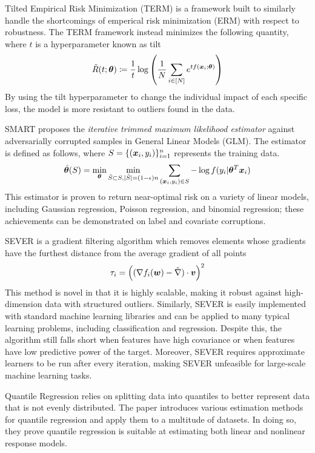 \documentclass{article} %
\begin{document}
	Tilted Empirical Risk Minimization (TERM) \cite{li2020tilted} is a framework built to similarly handle the shortcomings of emperical risk minimization (ERM) with respect to robustness. The TERM framework instead minimizes the following quantity, where $t$ is a hyperparameter known as tilt
	\begin{equation}
		\tilde{R}(t;{\bm{\theta}}) \coloneqq \frac{1}{t} \log\left(\frac{1}{N}\sum_{i \in \left[N\right]}e^{tf({\bm{x}}_i;{\bm{\theta}})} \right)
	\end{equation}
	By using the tilt hyperparameter to change the individual impact of each specific loss, the model is more resistant to outliers found in the data.
	
	SMART \cite{https://doi.org/10.48550/arxiv.2206.04777} proposes the \textit{iterative trimmed maximum likelihood estimator} against adversarially corrupted samples in General Linear Models (GLM). The estimator is defined as follows, where $S = \{({\bm{x}}_i,y_i)\}_{i=1}^n$ represents the training data. \vspace{1em}
	\begin{equation}
		\hat{{\bm{\theta}}}(S) = \min_{{\bm{\theta}}} \min_{\hat{S} \subset S, |\hat{S}| = (1-{\epsilon})n} \sum_{({\bm{x}}_i,y_i) \in S} -\log f(y_i|{\bm{\theta}}^T{\bm{x}}_i)
	\end{equation}
	This estimator is proven to return near-optimal risk on a variety of linear models, including Gaussian regression, Poisson regression, and binomial regression; these achievements can be demonstrated on label and covariate corruptions.
	
	
	SEVER \cite{DiakonikolasKKLSS19} is a gradient filtering algorithm which removes elements whose gradients have the furthest distance from the average gradient of all points
	\begin{equation}
		\tau_i = \left((\nabla f_i({\bm{w}}) - \hat{\nabla})\cdot {\bm{v}}\right)^2
	\end{equation}
	This method is novel in that it is highly scalable, making it robust against high-dimension data with structured outliers. Similarly, SEVER is easily implemented with standard machine learning libraries and can be applied to many typical learning problems, including classification and regression. Despite this, the algorithm still falls short when features have high covariance or when features have low predictive power of the target. Moreover, SEVER requires approximate learners to be run after every iteration, making SEVER unfeasible for large-scale machine learning tasks. 
	
	Quantile Regression \cite{yu_quantile_2003} relies on splitting data into quantiles to better represent data that is not evenly distributed. The paper introduces various estimation methods for quantile regression and apply them to a multitude of datasets. In doing so, they prove quantile regression is suitable at estimating both linear and nonlinear response models.
	
\end{document}
